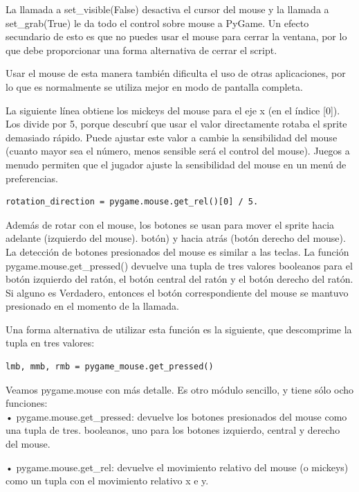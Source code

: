 {La llamada a {\ttfamily set\_visible(False)} desactiva el cursor del mouse y la llamada a {\ttfamily set\_grab(True)} le da todo el
control sobre mouse a PyGame. Un efecto secundario de esto es que no puedes usar el mouse para
cerrar la ventana, por lo que debe proporcionar una forma alternativa de cerrar el script.

Usar el mouse de esta manera también dificulta el uso de otras aplicaciones, por lo que es normalmente se utiliza mejor en modo de pantalla completa. 

La siguiente línea obtiene los {\ttfamily mickeys} del mouse para el eje x (en el índice [0]). 
Los divide por 5, porque descubrí que usar el valor directamente rotaba el sprite demasiado rápido. Puede ajustar este valor a
cambie la sensibilidad del mouse (cuanto mayor sea el número, menos sensible será el control del mouse). 
Juegos a menudo permiten que el jugador ajuste la sensibilidad del mouse en un menú de preferencias.

\begin{lstlisting}		
rotation_direction = pygame.mouse.get_rel()[0] / 5.	
\end{lstlisting}	

Además de rotar con el mouse, los botones se usan para mover el sprite hacia adelante (izquierdo del mouse).
botón) y hacia atrás (botón derecho del mouse). La detección de botones presionados del mouse es similar a las teclas. 
La función {\ttfamily pygame.mouse.get\_pressed()} devuelve una tupla de tres valores booleanos para el botón izquierdo del ratón, el
botón central del ratón y el botón derecho del ratón. Si alguno es Verdadero, entonces el botón correspondiente del mouse
se mantuvo presionado en el momento de la llamada.

Una forma alternativa de utilizar esta función es la siguiente, que descomprime la tupla en tres valores:
\begin{lstlisting}		
lmb, mmb, rmb = pygame_mouse.get_pressed()	
\end{lstlisting}


Veamos {\ttfamily pygame.mouse} con más detalle. Es otro módulo sencillo, y tiene sólo ocho funciones:\\

• {\ttfamily pygame.mouse.get\_pressed}: devuelve los botones presionados del mouse como una tupla de tres.
booleanos, uno para los botones izquierdo, central y derecho del mouse.

• {\ttfamily pygame.mouse.get\_rel}: devuelve el movimiento relativo del mouse (o mickeys) como un
tupla con el movimiento relativo x e y.

}
